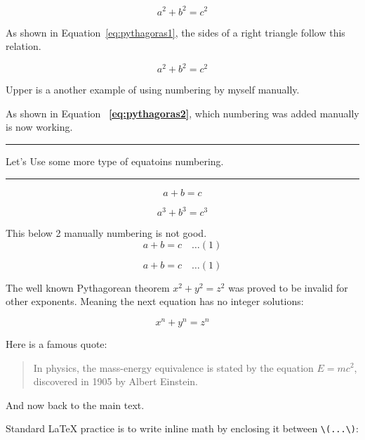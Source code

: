 \documentclass[12pt, letterpaper]{article}
\begin{document}
\setcounter{equation}{0}  %

\begin{equation}
    a^2 + b^2 = c^2
    \label{eq:pythagoras1}
\end{equation}


As shown in Equation~\ref{eq:pythagoras1}, the sides of a right triangle follow this relation.


\begin{equation}
    a^2 + b^2 = c^2 
    \tag{Rana 1}
    \label{eq:pythagoras2}
\end{equation}

Upper is a another example of using numbering by myself manually.

As shown in Equation~ \textbf{\ref{eq:pythagoras2}}, which numbering was added manually is now working.



\noindent\rule{\linewidth}{5pt}
\begin{center}
Let's Use some more type of equatoins numbering.
\end{center}
\noindent\rule{\linewidth}{5pt}


\begin{equation}
    a + b = c \tag{000}
\end{equation}


\begin{equation}
    a^3 + b^3 = c^3
    \label{eq:pythagoras3}
\end{equation}


This below 2 manually numbering is not good.
\[
a + b = c \quad \ldots (1)
\]

$$
a + b = c \quad \ldots (1)
$$



\newpage


The well known Pythagorean theorem \(x^2 + y^2 = z^2\) was 
proved to be invalid for other exponents. 
Meaning the next equation has no integer solutions:

\[ x^n + y^n = z^n \]


Here is a famous quote:

\begin{quote}
In physics, the mass-energy equivalence is stated 
by the equation \(E=mc^2\), discovered in 1905 by Albert Einstein.
\end{quote}

And now back to the main text.




\noindent Standard \LaTeX{} practice is to write inline math by enclosing it between \verb|\(...\)|:
\end{document}
